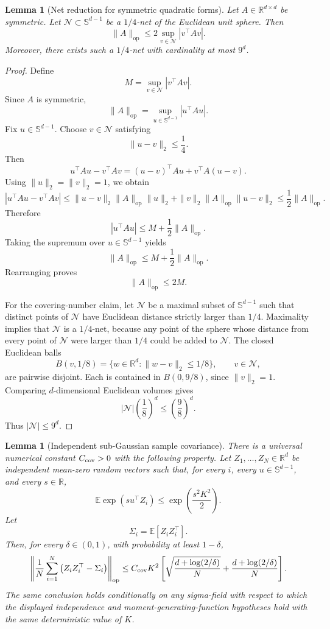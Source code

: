 \documentclass{article} %
\newtheorem{lemma}[theorem]{Lemma}
\begin{document}
\begin{lemma}[Net reduction for symmetric quadratic forms]
\label{lem:err-control-net-reduction-final}
Let \(A\in\mathbb{R}^{d\times d}\) be symmetric.  Let
\(\mathcal{N}\subset\mathbb{S}^{d-1}\) be a \(1/4\)-net of the Euclidean unit
sphere.  Then
\[
\|A\|_{\mathrm{op}}
\le
2\sup_{v\in\mathcal{N}} |v^\top A v|.
\]
Moreover, there exists such a \(1/4\)-net with cardinality at most \(9^d\).
\end{lemma}

\begin{proof}
Define
\[
M=\sup_{v\in\mathcal{N}} |v^\top A v|.
\]
Since \(A\) is symmetric,
\[
\|A\|_{\mathrm{op}}
=
\sup_{u\in\mathbb{S}^{d-1}} |u^\top A u|.
\]
Fix \(u\in\mathbb{S}^{d-1}\).  Choose \(v\in\mathcal{N}\) satisfying
\[
\|u-v\|_2\le \frac14.
\]
Then
\[
u^\top A u-v^\top A v
=
(u-v)^\top A u+v^\top A(u-v).
\]
Using \(\|u\|_2=\|v\|_2=1\), we obtain
\[
|u^\top A u-v^\top A v|
\le
\|u-v\|_2\|A\|_{\mathrm{op}}\|u\|_2
+
\|v\|_2\|A\|_{\mathrm{op}}\|u-v\|_2
\le
\frac12\|A\|_{\mathrm{op}}.
\]
Therefore
\[
|u^\top A u|
\le
M+\frac12\|A\|_{\mathrm{op}}.
\]
Taking the supremum over \(u\in\mathbb{S}^{d-1}\) yields
\[
\|A\|_{\mathrm{op}}
\le
M+\frac12\|A\|_{\mathrm{op}}.
\]
Rearranging proves
\[
\|A\|_{\mathrm{op}}\le 2M.
\]

For the covering-number claim, let \(\mathcal{N}\) be a maximal subset of
\(\mathbb{S}^{d-1}\) such that distinct points of \(\mathcal{N}\) have
Euclidean distance strictly larger than \(1/4\).  Maximality implies that
\(\mathcal{N}\) is a \(1/4\)-net, because any point of the sphere whose distance
from every point of \(\mathcal{N}\) were larger than \(1/4\) could be added to
\(\mathcal{N}\).  The closed Euclidean balls
\[
B(v,1/8)=\{w\in\mathbb{R}^d:\|w-v\|_2\le 1/8\},
\qquad v\in\mathcal{N},
\]
are pairwise disjoint.  Each is contained in \(B(0,9/8)\), since
\(\|v\|_2=1\).  Comparing \(d\)-dimensional Euclidean volumes gives
\[
|\mathcal{N}|\left(\frac18\right)^d
\le
\left(\frac98\right)^d.
\]
Thus \(|\mathcal{N}|\le 9^d\).
\end{proof}

\begin{lemma}[Independent sub-Gaussian sample covariance]
\label{lem:err-control-independent-subg-cov-final}
There is a universal numerical constant \(C_{\rm cov}>0\) with the following
property.  Let \(Z_1,\ldots,Z_N\in\mathbb{R}^d\) be independent mean-zero random
vectors such that, for every \(i\), every \(u\in\mathbb{S}^{d-1}\), and every
\(s\in\mathbb{R}\),
\[
\mathbb{E}\exp(su^\top Z_i)
\le
\exp\!\left(\frac{s^2K^2}{2}\right).
\]
Let
\[
\Sigma_i=\mathbb{E}[Z_iZ_i^\top].
\]
Then, for every \(\delta\in(0,1)\), with probability at least \(1-\delta\),
\[
\left\|
\frac1N\sum_{i=1}^N
\left(Z_iZ_i^\top-\Sigma_i\right)
\right\|_{\mathrm{op}}
\le
C_{\rm cov}K^2
\left[
\sqrt{\frac{d+\log(2/\delta)}{N}}
+
\frac{d+\log(2/\delta)}{N}
\right].
\]
The same conclusion holds conditionally on any sigma-field with respect to
which the displayed independence and moment-generating-function hypotheses hold
with the same deterministic value of \(K\).
\end{lemma}
\end{document}
